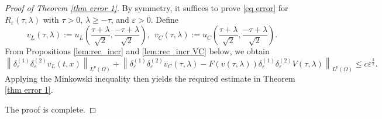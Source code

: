 \documentclass[11pt,reqno]{amsart}
\numberwithin{equation}{section}
\newcommand{\1}{{\bf 1}}
\newcommand{\2}{{\bf 2}}
\begin{document}
 
\begin{proof}[Proof of Theorem \ref{thm error 1}]      
 By symmetry,  it suffices  to prove  \eqref{eq error} for $R_{\varepsilon}(\tau, \lambda)$ with $\tau>0$, $\lambda\ge -\tau$, and $\varepsilon>0$.   Define 
\begin{equation}\label{SWE vL}
v_L(\tau, \lambda) := u_L\left(\frac{\tau+\lambda}{\sqrt{2}}, \frac{-\tau+\lambda}{\sqrt{2}}\right),  \  \ v_C(\tau, \lambda) := u_C\left(\frac{\tau+\lambda}{\sqrt{2}}, \frac{-\tau+\lambda}{\sqrt{2}}\right).
\end{equation}
From Propositions \ref{lem:rec_incr} and \ref{lem:rec_incr VC} below, we obtain
   $$
      \left\|\delta_{\varepsilon}^{(1)}\delta_{\varepsilon}^{(2)}  v_L(t, x) \right\|_{L^p(\Omega)}    +
\left \| \delta_{\varepsilon}^{(1)}\delta_{\varepsilon}^{(2)}v_C(\tau, \lambda)-F(v(\tau, \lambda))\delta_{\varepsilon}^{(1)}\delta_{\varepsilon}^{(2)}V(\tau, \lambda)\right\|_{L^p(\Omega)} \le c    \varepsilon^{\frac{3}{2}}.
$$
Applying the Minkowski inequality then yields the required estimate in Theorem \ref{thm error 1}.
 
               The proof is complete.            
                       \end{proof}
  
  
 
  
 
\end{document}
